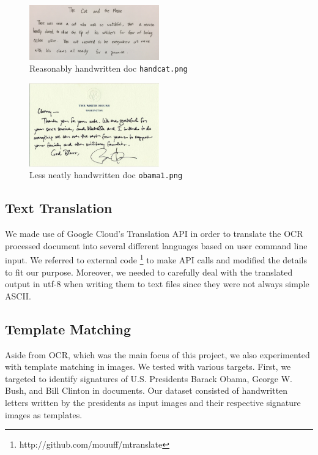 \documentclass[11pt,letterpaper]{article}
\begin{document}
\begin{figure}[t!]
  \centering
  \includegraphics[keepaspectratio, width=0.5\textwidth]{cat.png}
  \caption{Reasonably handwritten doc {\tt hand\textunderscore cat.png}}
\end{figure}

\begin{figure}[t!]
  \centering
  \includegraphics[keepaspectratio, width=0.5\textwidth]{obama4.png}
  \caption{Less neatly handwritten doc {\tt obama1.png}}
\end{figure}

\subsection{Text Translation}

We made use of Google Cloud's Translation API in order to translate the OCR processed document into several different languages based on user command line input. We referred to external code \footnote{http://github.com/mouuff/mtranslate} to make API calls and modified the details to fit our purpose. Moreover, we needed to carefully deal with the translated output in utf-8 when writing them to text files since they were not always simple ASCII.

\subsection{Template Matching}

Aside from OCR, which was the main focus of this project, we also experimented with template matching in images. We tested with various targets. First, we targeted to identify signatures of U.S. Presidents Barack Obama, George W. Bush, and Bill Clinton in documents. Our dataset consisted of handwritten letters written by the presidents as input images and their respective signature images as templates.
\end{document}

